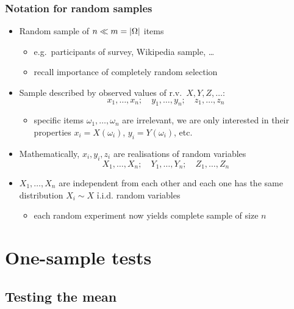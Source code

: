 \documentclass[t]{beamer} %
\begin{document}
\begin{frame}
  \frametitle{Notation for random samples}

  \begin{itemize}
  \item Random sample of $n \ll m = \lvert \Omega\rvert$ items
    \begin{itemize}
    \item e.g.\ participants of survey, Wikipedia sample, \ldots
    \item recall importance of completely random selection
    \end{itemize}
  \item Sample described by observed values of r.v.\ $X, Y, Z, \ldots$:
    \[
    x_1, \ldots, x_n; \quad y_1, \ldots, y_n; \quad z_1, \ldots, z_n
    \]
    \ungap[1]
    \begin{itemize}
    \item[\hand] specific items $\omega_1, \ldots, \omega_n$ are irrelevant,
      we are only interested in their properties $x_i = X(\omega_i)$,
      $y_i = Y(\omega_i)$, etc.
    \end{itemize}
    \pause
  \item Mathematically, $x_i, y_i, z_i$ are realisations of random variables
    \[
    X_1, \ldots, X_n; \quad Y_1, \ldots, Y_n; \quad Z_1, \ldots, Z_n
    \]
  \item $X_1,\ldots, X_n$ are independent from each other and each one has the
    same distribution $X_i \sim X$ \so \h{i.i.d.} random variables
    \begin{itemize}
    \item[\hand] each random experiment now yields complete sample of size $n$
    \end{itemize}
  \end{itemize}

\end{frame}

\section{One-sample tests}

\subsection{Testing the mean}
\end{document}
